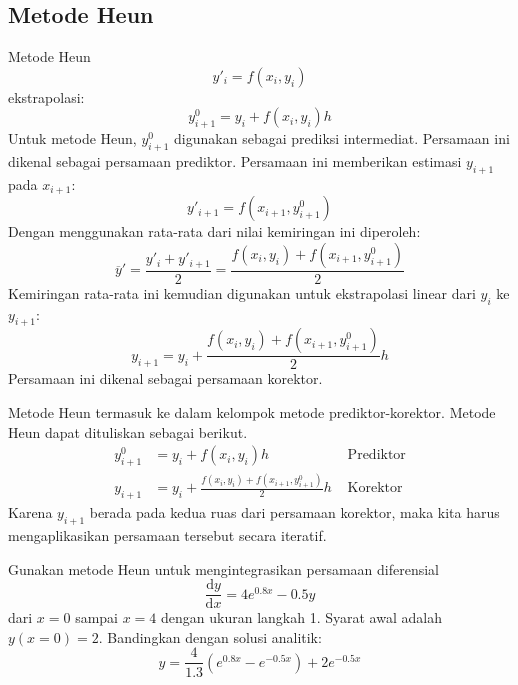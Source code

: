 \subsection{Metode Heun}

Metode Heun
\begin{equation*}
y'_{i} = f(x_i, y_i)
\end{equation*}
ekstrapolasi:
\begin{equation*}
y^{0}_{i+1} = y_{i} + f(x_i, y_i) h
\end{equation*}
Untuk metode Heun, $y^{0}_{i+1}$ digunakan sebagai prediksi intermediat.
Persamaan ini dikenal sebagai persamaan prediktor.
Persamaan ini memberikan estimasi $y_{i+1}$ pada $x_{i+1}$:
\begin{equation*}
y'_{i+1} = f(x_{i+1}, y^{0}_{i+1})
\end{equation*}
Dengan menggunakan rata-rata dari nilai kemiringan ini diperoleh:
\begin{equation*}
\overline{y}' = \frac{y'_{i} + y'_{i+1}}{2} = 
\frac{f(x_i, y_i) + f(x_{i+1},y^{0}_{i+1})}{2}
\end{equation*}
Kemiringan rata-rata ini kemudian digunakan untuk ekstrapolasi linear dari $y_{i}$ ke
$y_{i+1}$:
\begin{equation*}
y_{i+1} = y_{i} + \frac{f(x_i, y_i) + f(x_{i+1}, y^{0}_{i+1})}{2} h
\end{equation*}
Persamaan ini dikenal sebagai persamaan korektor.

Metode Heun termasuk ke dalam kelompok metode prediktor-korektor. Metode Heun dapat
dituliskan sebagai berikut.
\begin{align}
y^{0}_{i+1} & = y_{i} + f(x_i, y_i) h & \text{   Prediktor}\\
y_{i+1} & = y_{i} + \frac{f(x_i, y_i) + f(x_{i+1}, y^{0}_{i+1})}{2} h & \text{   Korektor}
\end{align}
Karena $y_{i+1}$ berada pada kedua ruas dari persamaan korektor, maka kita harus mengaplikasikan
persamaan tersebut secara iteratif.


\begin{soal}
Gunakan metode Heun untuk mengintegrasikan persamaan diferensial
\begin{equation*}
\frac{\mathrm{d}y}{\mathrm{d}x} = 4e^{0.8x} - 0.5y
\end{equation*}
dari $x=0$ sampai $x=4$ dengan ukuran langkah 1. Syarat awal adalah
$y(x=0) = 2$.
Bandingkan dengan solusi analitik:
\begin{equation*}
y = \frac{4}{1.3} \left( e^{0.8x} - e^{-0.5x} \right) + 2e^{-0.5x}
\end{equation*}
\end{soal}


